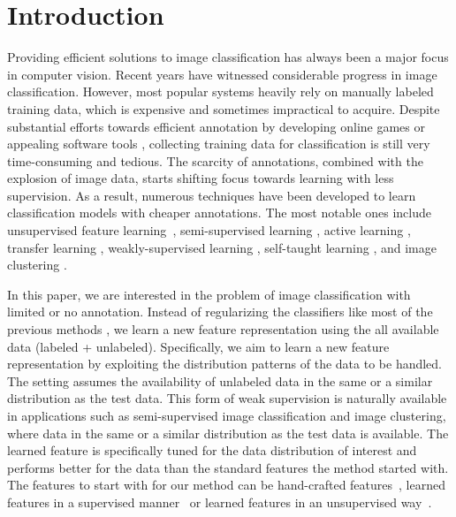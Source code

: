 \documentclass[preprint,12pt,3p]{elsarticle}
\begin{document}

\section{Introduction}
\label{sec:intro}
Providing efficient solutions to image classification has always been a
major focus in computer vision. Recent years have witnessed
considerable progress in image classification. However, most popular
systems \citep{lazebnik:cvpr06, Indoor, siftllc:cvpr10, 
Sun_2010,  dai:TSC:11, Yang_2014_CVPR, nips12:cnn} heavily rely
on manually labeled training data, which is expensive and sometimes
impractical to acquire. Despite substantial efforts towards
efficient annotation by developing online games \citep{game:purpose}
or appealing software tools \citep{labelme}, collecting training data
for classification is still very time-consuming and tedious. The scarcity
of annotations, combined with the explosion of image data, starts
shifting focus towards learning with less supervision. As a result,
numerous techniques have been developed to learn classification models
with cheaper annotations. The most notable ones include unsupervised feature 
learning~\citep{stl-10, cnnfet14, feature:context, feature:LSTM},  
semi-supervised learning \citep{Fergus09, Guillaumin:cvpr:10, dai:iccv13b}, 
active learning \citep{JainK:cvpr09, cvpr09:multi:al},
transfer learning \citep{Transfer:CVPR:08, tl:survey},
weakly-supervised learning \citep{cvpr12:weak:video, metric:imitation}, self-taught learning
\citep{self-taught:icml07}, and image clustering
\citep{Sivic05b, dai}.


In this paper, we are interested in the problem of  image classification 
with limited or no annotation. Instead of regularizing the
classifiers like most of the previous methods \citep{SemiSVM, Joachims:1999,
  SemiBoost, SemiForest}, we learn a new feature representation 
using the all available data (labeled + unlabeled). 
Specifically, we aim to learn a new feature representation by exploiting 
the distribution patterns of the data to be handled. The setting assumes the availability of 
unlabeled data in the same or a similar distribution as the test data. 
This form of weak supervision is naturally available in applications such as
semi-supervised  image classification and image clustering, where data in the same or a similar 
distribution as the test data is available. The learned feature is specifically tuned for the data distribution of interest 
and performs better for the data than the standard features the method started with.  
The features to start with for our method can be hand-crafted features~\citep{gist, Ojala02,Bosch:iccv07,siftllc:cvpr10},  
learned features in a supervised manner~\cite{caffe14, rich:feature:cvpr14, deep:bmvc14} or 
learned features in an unsupervised way~\cite{stl-10, cnnfet14, feature:context, feature:LSTM, feature:video}.  
\end{document}
